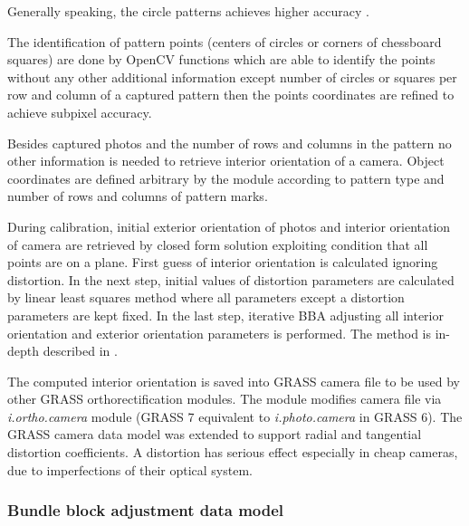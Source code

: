 \documentclass[a4paper,12pt]{article}
\newcommand{\term}[1]{%
{\it #1}%
}
\begin{document}
Generally speaking, the circle patterns achieves higher accuracy \cite{camera_calibration2013opencv}.

The identification of pattern points (centers of circles or corners of chessboard squares) 
are done by OpenCV functions which are able to identify the points
without any other additional information except number of circles or squares per row and column
of a captured pattern then the points coordinates are refined to achieve subpixel accuracy.

Besides  captured photos and the number of rows and columns in the pattern
no other information is needed to retrieve interior orientation of a camera.
Object coordinates are defined
arbitrary by the module according to pattern type and number of rows and columns of pattern marks.

During calibration, initial exterior orientation of photos and interior orientation of camera are retrieved 
by closed form solution exploiting condition that all points are on a plane.
First guess  of interior orientation is calculated ignoring distortion.
In the next step, initial values of distortion parameters are calculated by linear least squares method
where all parameters except a distortion parameters are kept fixed.
In the last step, iterative BBA adjusting all interior orientation and exterior orientation parameters 
is performed.
The method is in-depth described 
in \cite{zhang2000flexible}.


The computed interior orientation is saved into GRASS camera file to be used by other GRASS 
orthorectification modules. The module modifies camera file via \term{i.ortho.camera} module 
(GRASS 7 equivalent to \term{i.photo.camera} in GRASS 6).
The GRASS camera data model was extended to support radial and tangential distortion coefficients. 
A distortion has serious effect especially in cheap cameras, due to imperfections of their optical system.

\subsubsection{Bundle block adjustment data model}
 
\end{document}
